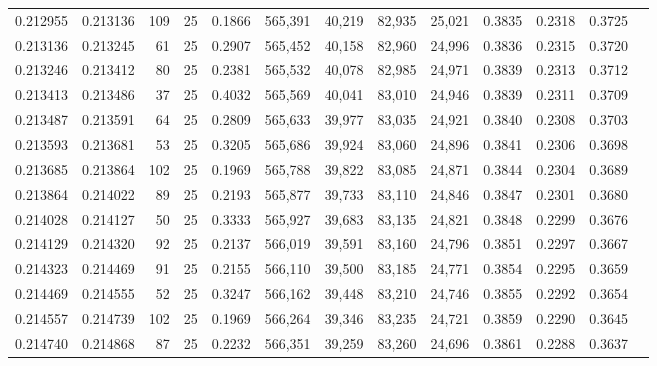 \begin{tabular}{rrrrrrrrrrrrr}
0.212955 & 0.213136 &   109 &  25 &                                     0.1866 & 565,391 &  40,219 &  82,935 &  25,021 & 0.3835 & 0.2318 & 0.3725 \\
0.213136 & 0.213245 &    61 &  25 &                                     0.2907 & 565,452 &  40,158 &  82,960 &  24,996 & 0.3836 & 0.2315 & 0.3720 \\
0.213246 & 0.213412 &    80 &  25 &                                     0.2381 & 565,532 &  40,078 &  82,985 &  24,971 & 0.3839 & 0.2313 & 0.3712 \\
0.213413 & 0.213486 &    37 &  25 &                                     0.4032 & 565,569 &  40,041 &  83,010 &  24,946 & 0.3839 & 0.2311 & 0.3709 \\
0.213487 & 0.213591 &    64 &  25 &                                     0.2809 & 565,633 &  39,977 &  83,035 &  24,921 & 0.3840 & 0.2308 & 0.3703 \\
0.213593 & 0.213681 &    53 &  25 &                                     0.3205 & 565,686 &  39,924 &  83,060 &  24,896 & 0.3841 & 0.2306 & 0.3698 \\
0.213685 & 0.213864 &   102 &  25 &                                     0.1969 & 565,788 &  39,822 &  83,085 &  24,871 & 0.3844 & 0.2304 & 0.3689 \\
0.213864 & 0.214022 &    89 &  25 &                                     0.2193 & 565,877 &  39,733 &  83,110 &  24,846 & 0.3847 & 0.2301 & 0.3680 \\
0.214028 & 0.214127 &    50 &  25 &                                     0.3333 & 565,927 &  39,683 &  83,135 &  24,821 & 0.3848 & 0.2299 & 0.3676 \\
0.214129 & 0.214320 &    92 &  25 &                                     0.2137 & 566,019 &  39,591 &  83,160 &  24,796 & 0.3851 & 0.2297 & 0.3667 \\
0.214323 & 0.214469 &    91 &  25 &                                     0.2155 & 566,110 &  39,500 &  83,185 &  24,771 & 0.3854 & 0.2295 & 0.3659 \\
0.214469 & 0.214555 &    52 &  25 &                                     0.3247 & 566,162 &  39,448 &  83,210 &  24,746 & 0.3855 & 0.2292 & 0.3654 \\
0.214557 & 0.214739 &   102 &  25 &                                     0.1969 & 566,264 &  39,346 &  83,235 &  24,721 & 0.3859 & 0.2290 & 0.3645 \\
0.214740 & 0.214868 &    87 &  25 &                                     0.2232 & 566,351 &  39,259 &  83,260 &  24,696 & 0.3861 & 0.2288 & 0.3637 \\

\end{tabular}
